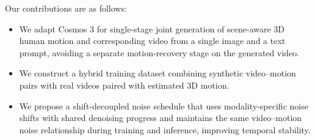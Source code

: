 Our contributions are as follows:
\begin{itemize}[leftmargin=*]
\item We adapt Cosmos 3 for single-stage joint generation of scene-aware 3D human motion and corresponding video from a single image and a text prompt, avoiding a separate motion-recovery stage on the generated video.
\item We construct a hybrid training dataset combining synthetic video--motion pairs with real videos paired with estimated 3D motion.
\item We propose a shift-decoupled noise schedule that uses modality-specific noise shifts with shared denoising progress and maintains the same video--motion noise relationship during training and inference, improving temporal stability.
\end{itemize}
